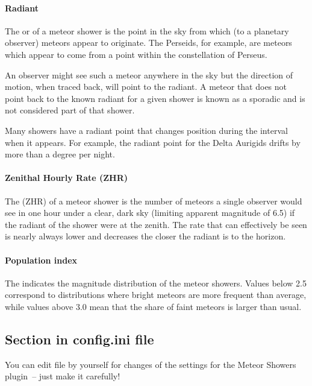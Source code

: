 \paragraph{Radiant}

The  or  of a meteor
shower is the point in the sky from which (to a planetary observer)
meteors appear to originate. The Perseids, for example, are meteors
which appear to come from a point within the constellation of Perseus.

An observer might see such a meteor anywhere in the sky but the
direction of motion, when traced back, will point to the radiant. A
meteor that does not point back to the known radiant for a given
shower is known as a sporadic and is not considered part of that
shower.

Many showers have a radiant point that changes position during the
interval when it appears. For example, the radiant point for the Delta
Aurigids drifts by more than a degree per night.

\paragraph{Zenithal Hourly Rate (ZHR)}

The  (ZHR) of a meteor
shower is the number of meteors a single observer would see in one
hour under a clear, dark sky (limiting apparent magnitude of 6.5) if
the radiant of the shower were at the zenith. The rate that can
effectively be seen is nearly always lower and decreases the closer
the radiant is to the horizon.

\paragraph{Population index}

The  indicates the magnitude distribution
of the meteor showers. Values below 2.5 correspond to
distributions where bright meteors are more frequent than average,
while values above 3.0 mean that the share of faint meteors is larger
than usual.

\subsection{Section  in config.ini file}

You can edit  file by yourself for changes of the
settings for the Meteor Showers plugin~-- just make it carefully!

